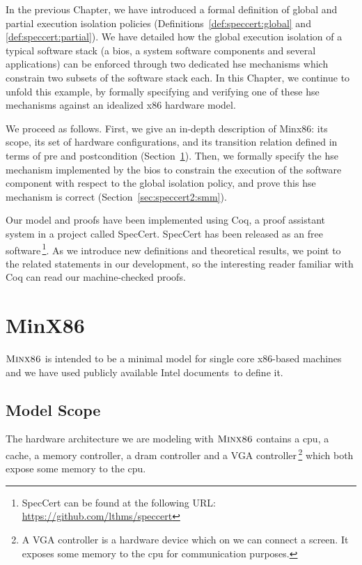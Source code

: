 \vspace{1cm}\noindent
%
In the previous Chapter, we have introduced a formal definition of global and
partial execution isolation policies (Definitions~\ref{def:speccert:global} and
\ref{def:speccert:partial}).
%
We have detailed how the global execution isolation of a typical software stack
(a \ac{bios}, a system software components and several applications) can be
enforced through two dedicated \ac{hse} mechanisms which constrain two subsets
of the software stack each.
%
In this Chapter, we continue to unfold this example, by formally specifying and
verifying one of these \ac{hse} mechanisms against an idealized {\sc x86}
hardware model.

We proceed as follows.
%
First, we give an in-depth description of {\sc Minx86}: its scope, its set of
hardware configurations, and its transition relation defined in terms of pre and
postcondition (Section~\ref{sec:speccert2:minx86}).
%
Then, we formally specify the \ac{hse} mechanism implemented by the \ac{bios} to
constrain the execution of the software component with respect to the global
isolation policy, and prove this \ac{hse} mechanism is correct
(Section~\ref{sec:speccert2:smm}).

Our model and proofs have been implemented using Coq, a proof assistant system
in a project called SpecCert.
%
SpecCert has been released as an free software\,\footnote{SpecCert can be
  found at the following URL: \url{https://github.com/lthms/speccert}}.
%
As we introduce new definitions and theoretical results, we point to the related
statements in our development, so the interesting reader familiar with Coq can
read our machine-checked proofs.

\section{{\sc MinX86}}
\label{sec:speccert2:minx86}

$\textsc{Minx86}$ is intended to be a minimal model for single core x86-based
machines and we have used publicly available Intel
documents\,\cite{intel2013celeron,intel2009mch,intel2014manual} to define it.

\subsection{Model Scope}

The hardware architecture we are modeling with $\textsc{Minx86}$ contains a
\ac{cpu}, a cache, a memory controller, a \ac{dram} controller and a VGA
controller\,\footnote{A VGA controller is a hardware device which on we can
  connect a screen. It exposes some memory to the \ac{cpu} for communication
  purposes.} which both expose some memory to the \ac{cpu}.

